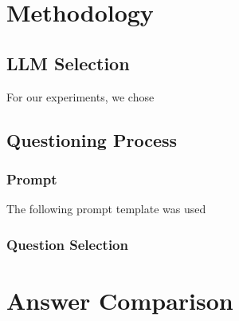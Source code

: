\documentclass[11pt]{article}
\begin{document}
    
    
    
    
    

\section{Methodology}

\subsection{LLM Selection}
For our experiments, we chose

\subsection{Questioning Process}

\subsubsection{Prompt}
The following prompt template was used

\subsubsection{Question Selection}



\section{Answer Comparison}
\end{document}
